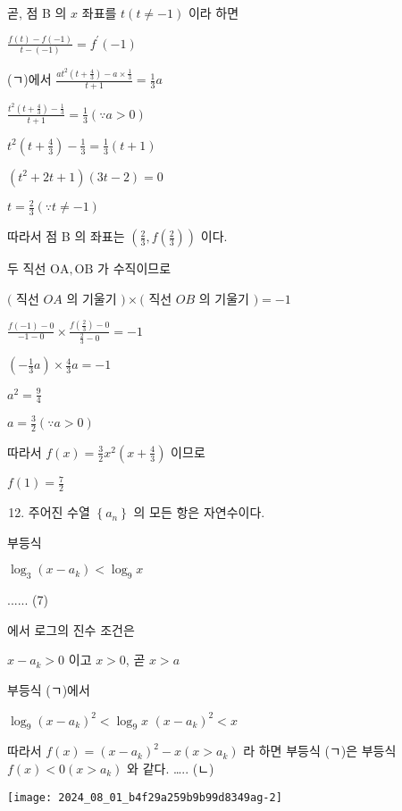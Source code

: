 \documentclass[10pt]{article}
\begin{document}
곧, 점 B 의 $x$ 좌표를 $t(t \neq-1)$ 이라 하면

$\frac{f(t)-f(-1)}{t-(-1)}=f^{\prime}(-1)$

(ㄱ)에서 $\frac{a t^{2}\left(t+\frac{4}{3}\right)-a \times \frac{1}{3}}{t+1}=\frac{1}{3} a$

$\frac{t^{2}\left(t+\frac{4}{3}\right)-\frac{1}{3}}{t+1}=\frac{1}{3}(\because a>0)$

$t^{2}\left(t+\frac{4}{3}\right)-\frac{1}{3}=\frac{1}{3}(t+1)$

$\left(t^{2}+2 t+1\right)(3 t-2)=0$

$t=\frac{2}{3}(\because t \neq-1)$

따라서 점 B 의 좌표는 $\left(\frac{2}{3}, f\left(\frac{2}{3}\right)\right)$ 이다.

두 직선 $\mathrm{OA}, \mathrm{OB}$ 가 수직이므로

$($ 직선 $O A$ 의 기울기 $) \times($ 직선 $O B$ 의 기울기 $)=-1$

$\frac{f(-1)-0}{-1-0} \times \frac{f\left(\frac{2}{3}\right)-0}{\frac{2}{3}-0}=-1$

$\left(-\frac{1}{3} a\right) \times \frac{4}{3} a=-1$

$a^{2}=\frac{9}{4}$

$a=\frac{3}{2}(\because a>0)$

따라서 $f(x)=\frac{3}{2} x^{2}\left(x+\frac{4}{3}\right)$ 이므로

$f(1)=\frac{7}{2}$

\begin{enumerate}
  \setcounter{enumi}{11}
  \item 주어진 수열 $\left\{a_{n}\right\}$ 의 모든 항은 자연수이다.
\end{enumerate}

부등식

$\log _{3}\left(x-a_{k}\right)<\log _{9} x$

...... (7)

에서 로그의 진수 조건은

$x-a_{k}>0$ 이고 $x>0$, 곧 $x>a$

부등식 (ㄱ)에서

$\log _{9}\left(x-a_{k}\right)^{2}<\log _{9} x$ $\left(x-a_{k}\right)^{2}<x$

따라서 $f(x)=\left(x-a_{k}\right)^{2}-x\left(x>a_{k}\right)$ 라 하면 부등식 (ㄱ)은 부등식 $f(x)<0\left(x>a_{k}\right)$ 와 같다. ….. (ㄴ)

\begin{center}
\texttt{[image: 2024\_08\_01\_b4f29a259b9b99d8349ag-2]}
\end{center}
\end{document}
